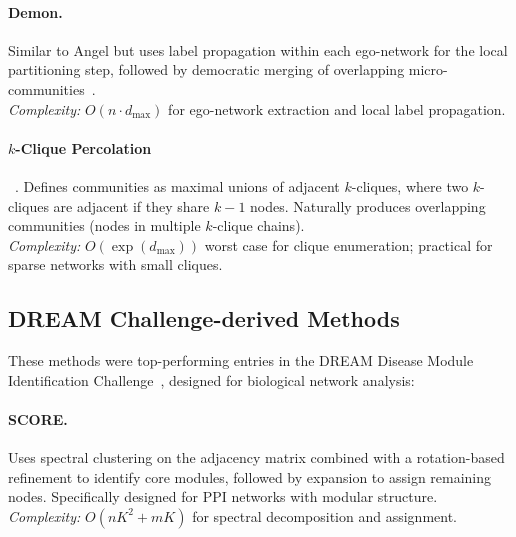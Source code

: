 \documentclass[11pt]{article}
\begin{document}
\paragraph{Demon.}
Similar to Angel but uses label propagation within each ego-network for the local partitioning step, followed by democratic merging of overlapping micro-communities~\citep{santo_fortunato_93a74814}.\\
\emph{Complexity:} $O(n\cdot d_{\max})$ for ego-network extraction and local label propagation.

\paragraph{$k$-Clique Percolation}~\citep{gergely_palla_c9fbd5c7}.
Defines communities as maximal unions of adjacent $k$-cliques, where two $k$-cliques are adjacent if they share $k{-}1$ nodes. Naturally produces overlapping communities (nodes in multiple $k$-clique chains).\\
\emph{Complexity:} $O(\exp(d_{\max}))$ worst case for clique enumeration; practical for sparse networks with small cliques.

\subsection{DREAM Challenge-derived Methods}

These methods were top-performing entries in the DREAM Disease Module Identification Challenge~\citep{choobdar_dream_2019}, designed for biological network analysis:

\paragraph{SCORE.}
Uses spectral clustering on the adjacency matrix combined with a rotation-based refinement to identify core modules, followed by expansion to assign remaining nodes. Specifically designed for PPI networks with modular structure.\\
\emph{Complexity:} $O(nK^2 + mK)$ for spectral decomposition and assignment.
\end{document}
